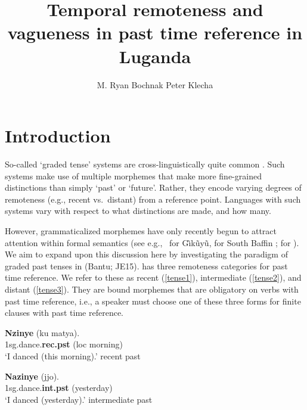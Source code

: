 \documentclass[output=paper,
modfonts
]{langscibook}
\title{Temporal remoteness and vagueness in past time reference in Luganda}
\author{ M. Ryan Bochnak\affiliation{University Konstanz}\lastand 
 Peter Klecha\affiliation{The Ohio State University}}
\begin{document}
\maketitle

\section{Introduction}

So-called `graded tense' systems are cross-linguistically quite common \citep{comrie85tense, dahl83temporal, mithun99languages, nurse08tense}. Such systems make use of multiple morphemes that make more fine-grained distinctions than simply `past' or `future'. Rather, they encode varying degrees of remoteness (e.g., recent vs.~distant) from a reference point. Languages with such systems vary with respect to what distinctions are made, and how many. 

However, grammaticalized  morphemes have only recently begun to attract attention within formal semantics (see e.g.,~\citealt{cable12beyond} for G\~\i k\~uy\~u, \citealt{hayashi11structure} for South Baffin ; \citealt{mucha14past} for ). We aim to expand upon this discussion here by investigating the paradigm of graded past tenses in  (Bantu; JE15).  has three remoteness categories for past time reference. We refer to these as {\sc recent} (\ref{tense1}), {\sc intermediate} (\ref{tense2}), and {\sc distant} (\ref{tense3}). They are bound morphemes that are obligatory on verbs with past time reference, i.e., a speaker must choose one of these three forms for finite clauses with past time reference.




\ea
\label{tense1}
\gll \textbf{Nzinye} (ku matya). \\
{\sc1sg}.dance{\sc.\textbf{rec.pst}} ({\sc loc} morning) \\
\glt `I danced (this morning).' \hfill {\sc recent past} \\
\z

 
\ea\label{tense2}
\gll \textbf{Nazinye} (jjo).\\
{\sc 1sg}.dance{\sc.\textbf{int.pst}} (yesterday)\\
\glt `I danced (yesterday).' \hfill {\sc intermediate past}\\
\z
\end{document}
